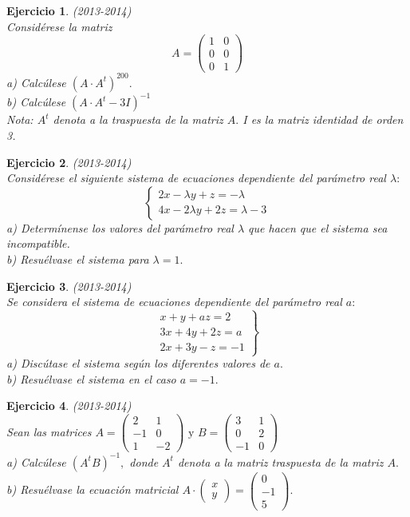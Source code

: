 \documentclass[12pt, a4paper]{amsart}
\newtheorem{ejer}{Ejercicio}
\begin{document}
\begin{ejer}\em  (2013-2014)\\
Considérese la matriz 
\[A=\begin{pmatrix}
1 & 0 \\ 0 & 0\\ 0 & 1
\end{pmatrix}
\]
a) Calcúlese $(A\cdot A^t)^{200}.$\\
b) Calcúlese $(A\cdot A^t - 3I)^{-1}$\\
\em Nota: $A^t$ denota a la traspuesta de la matriz $A.$ I es la matriz identidad de orden 3.
\end{ejer}

\begin{ejer}\em  (2013-2014)\\
Considérese el siguiente sistema de ecuaciones dependiente del parámetro real $\lambda :$
\[
\left \{ \begin{matrix}
2x-\lambda y+z=-\lambda
\\ 4x-2\lambda y +2z=\lambda-3
\end{matrix}\right.
\]
a) Determínense los valores del parámetro real $\lambda$ que hacen que el sistema sea incompatible.\\
b) Resuélvase el sistema para $\lambda=1.$
\end{ejer}

\begin{ejer}\em  (2013-2014)\\
Se considera el sistema de ecuaciones dependiente del parámetro real $a:$\\
\[
\left. \begin{matrix}
x+y+az=2
\\ 3x+4y+2z=a
\\ 2x+3y-z=-1
\end{matrix}  \right \}
\]
a) Discútase el sistema según los diferentes valores de $a.$\\
b) Resuélvase el sistema en el caso $a=-1.$
\end{ejer}

\begin{ejer}\em  (2013-2014)\\
Sean las matrices $A=\begin{pmatrix}
2 & 1\\ -1 & 0\\ 1 & -2
\end{pmatrix}\text{ y } B=\begin{pmatrix}
3 & 1\\ 0 & 2 \\ -1 & 0
\end{pmatrix}$\\
a) Calcúlese $(A^tB)^{-1},$ donde $A^t$ denota a la matriz traspuesta de la matriz $A.$\\
b) Resuélvase la ecuación matricial $A\cdot \begin{pmatrix}
x\\y
\end{pmatrix}=\begin{pmatrix}
0\\-1\\ 5
\end{pmatrix}.$
\end{ejer}
\end{document}
